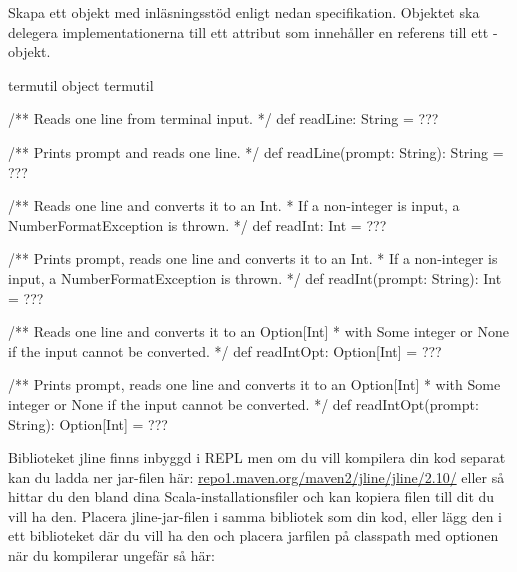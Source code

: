 \Subtask Skapa ett objekt med inläsningsstöd enligt nedan specifikation. Objektet ska delegera implementationerna till ett attribut  som innehåller en referens till ett -objekt.  
\begin{ScalaSpec}{termutil}
object termutil {
  /** Reads one line from terminal input. */
  def readLine: String = ???

  /** Prints prompt and reads one line. */
  def readLine(prompt: String): String = ???

  /** Reads one line and converts it to an Int. 
   *  If a non-integer is input, a NumberFormatException is thrown.  */
  def readInt: Int = ???

  /** Prints prompt, reads one line and converts it to an Int. 
   *  If a non-integer is input, a NumberFormatException is thrown.  */
  def readInt(prompt: String): Int = ???

  /** Reads one line and converts it to an Option[Int]
   *  with Some integer or None if the input cannot be converted.  */
  def readIntOpt: Option[Int] = ???

  /** Prints prompt, reads one line and converts it to an Option[Int]
   *  with Some integer or None if the input cannot be converted.  */
  def readIntOpt(prompt: String): Option[Int] = ???
}
\end{ScalaSpec}
Biblioteket jline finns inbyggd i REPL men om du vill kompilera din kod separat kan du ladda ner jar-filen här: \href{http://repo1.maven.org/maven2/jline/jline/2.10/}{repo1.maven.org/maven2/jline/jline/2.10/} eller så hittar du den bland dina Scala-installationsfiler och kan kopiera filen till dit du vill ha den. Placera jline-jar-filen i samma bibliotek som din kod, eller lägg den i ett biblioteket där du vill ha den och placera jarfilen på classpath med optionen  när du kompilerar ungefär så här: \\ 
